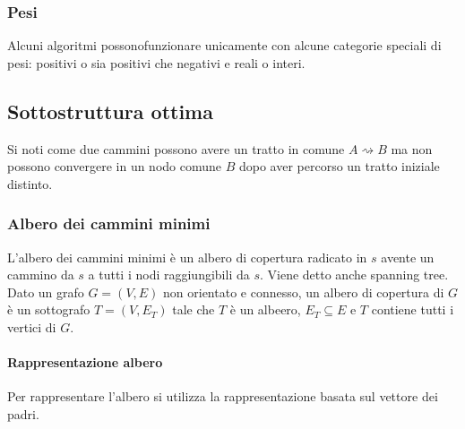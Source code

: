 \subsubsection{Pesi}
Alcuni algoritmi possonofunzionare unicamente con alcune categorie speciali di pesi: positivi o sia positivi che negativi e reali o interi.
\subsection{Sottostruttura ottima}
Si noti come due cammini possono avere un tratto in comune $A\rightsquigarrow B$ ma non possono convergere in un nodo comune $B$ dopo aver percorso un tratto iniziale distinto. 
\subsubsection{Albero dei cammini minimi}
L'albero dei cammini minimi \`e un albero di copertura radicato in $s$ avente un cammino da $s$ a tutti i nodi raggiungibili da $s$. Viene detto anche spanning tree. Dato un grafo $G=
(V, E)$ non orientato e connesso, un albero di copertura di $G$ \`e un sottografo $T=(V, E_T)$ tale che $T$ \`e un albeero, $E_T\subseteq E$ e $T$ contiene tutti i vertici di $G$. 
\paragraph{Rappresentazione albero}
Per rappresentare l'albero si utilizza la rappresentazione basata sul vettore dei padri.
